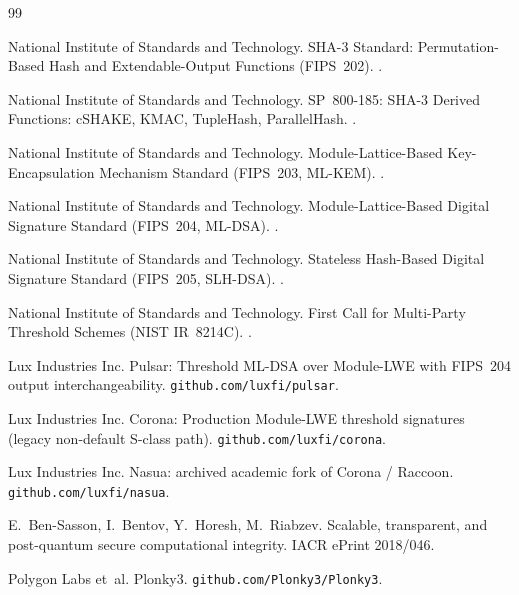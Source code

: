 \documentclass[11pt,a4paper]{article}
\begin{document}
\begin{thebibliography}{99}

National Institute of Standards and Technology.
\newblock SHA-3 Standard: Permutation-Based Hash and
Extendable-Output Functions (FIPS~202).
.

National Institute of Standards and Technology.
\newblock SP~800-185: SHA-3 Derived Functions: cSHAKE, KMAC,
TupleHash, ParallelHash.
.

National Institute of Standards and Technology.
\newblock Module-Lattice-Based Key-Encapsulation Mechanism
Standard (FIPS~203, ML-KEM).
.

National Institute of Standards and Technology.
\newblock Module-Lattice-Based Digital Signature Standard
(FIPS~204, ML-DSA).
.

National Institute of Standards and Technology.
\newblock Stateless Hash-Based Digital Signature Standard
(FIPS~205, SLH-DSA).
.

National Institute of Standards and Technology.
\newblock First Call for Multi-Party Threshold Schemes (NIST
IR~8214C).
.

Lux Industries Inc.
\newblock Pulsar: Threshold ML-DSA over Module-LWE with FIPS~204
output interchangeability.
\newblock \texttt{github.com/luxfi/pulsar}.

Lux Industries Inc.
\newblock Corona: Production Module-LWE threshold signatures (legacy
non-default S-class path).
\newblock \texttt{github.com/luxfi/corona}.

Lux Industries Inc.
\newblock Nasua: archived academic fork of Corona / Raccoon.
\newblock \texttt{github.com/luxfi/nasua}.

E.~Ben-Sasson, I.~Bentov, Y.~Horesh, M.~Riabzev.
\newblock Scalable, transparent, and post-quantum secure
computational integrity.
\newblock IACR ePrint 2018/046.

Polygon Labs et~al.
\newblock Plonky3.
\newblock \texttt{github.com/Plonky3/Plonky3}.

\end{thebibliography}
\end{document}
